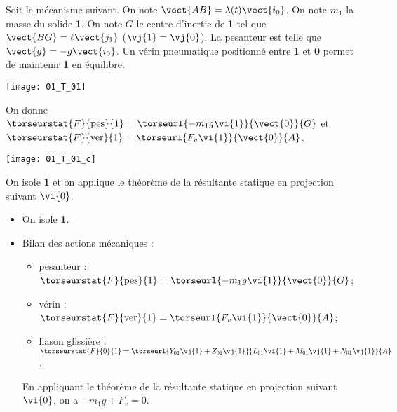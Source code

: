 \normaltrue
\correctiontrue


\setcounter{question}{0}
\ifcorrection
\else
{}
\fi

\ifprof
\else
Soit le mécanisme suivant. On note $\vect{AB}=\lambda(t)\vect{i_0}$. On note $m_1$ la masse du solide \textbf{1}.
On note $G$ le centre d'inertie de \textbf{1} tel que $\vect{BG}=\ell \vect{j_1}$ ($\vj{1}=\vj{0}$). La pesanteur est telle que $\vect{g}=-g\vect{i_0}$. Un vérin pneumatique positionné entre \textbf{1} et \textbf{0} permet de maintenir \textbf{1} en équilibre. 
\begin{center}
\texttt{[image: 01\_T\_01]}
\end{center}


On donne 
$\torseurstat{F}{\text{pes}}{1}=\torseurl{-m_1g\vi{1}}{\vect{0}}{G}$ et 
$\torseurstat{F}{\text{ver}}{1}=\torseurl{F_v\vi{1}}{\vect{0}}{A}$.
\fi

\ifprof
\begin{center}
\texttt{[image: 01\_T\_01\_c]}
\end{center}
\else
\fi

\ifprof
\else
On isole \textbf{1} et on applique le théorème de la résultante statique en projection suivant $\vi{0}$.
\fi

\ifprof
\begin{itemize}
\item On isole \textbf{1}.
\item Bilan des actions mécaniques :
\begin{itemize}
\item pesanteur : $\torseurstat{F}{\text{pes}}{1}=\torseurl{-m_1g\vi{1}}{\vect{0}}{G}$;
\item vérin : $\torseurstat{F}{\text{ver}}{1}=\torseurl{F_v\vi{1}}{\vect{0}}{A}$;
\item liason glissière : $\torseurstat{F}{0}{1}=\torseurl{Y_{01}\vj{1}+Z_{01}\vj{1}}{L_{01}\vi{1}+M_{01}\vj{1}+N_{01}\vj{1}}{A}$.
\end{itemize}
En appliquant le théorème de la résultante statique en projection suivant $\vi{0}$, on a $-m_1g+F_v = 0$.

\end{itemize}
\else
\fi

